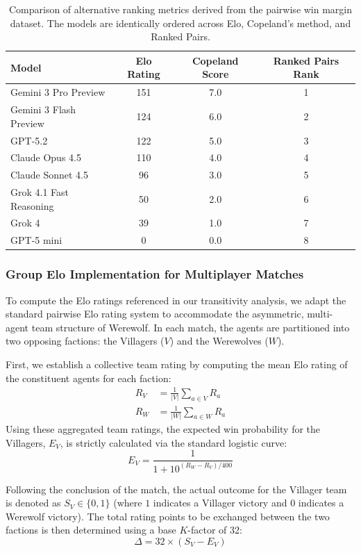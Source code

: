\documentclass{article}
\begin{document}
\begin{table}[H]
    \centering
    \begin{tabular}{l c c c}
        \hline
        \textbf{Model} & \textbf{Elo Rating} & \textbf{Copeland Score} & \textbf{Ranked Pairs Rank} \\
        \hline
        Gemini 3 Pro Preview & 151 & 7.0 & 1 \\
        Gemini 3 Flash Preview & 124 & 6.0 & 2 \\
        GPT-5.2 & 122 & 5.0 & 3 \\
        Claude Opus 4.5 & 110 & 4.0 & 4 \\
        Claude Sonnet 4.5 & 96 & 3.0 & 5 \\
        Grok 4.1 Fast Reasoning & 50 & 2.0 & 6 \\
        Grok 4 & 39 & 1.0 & 7 \\
        GPT-5 mini & 0 & 0.0 & 8 \\
        \hline
    \end{tabular}
    \vspace{2mm}
    \caption{Comparison of alternative ranking metrics derived from the pairwise win margin dataset. The models are identically ordered across Elo, Copeland's method, and Ranked Pairs.}
    \label{tab:alternative_rankings}
\end{table}

\subsubsection{Group Elo Implementation for Multiplayer Matches}
To compute the Elo ratings referenced in our transitivity analysis, we adapt the standard pairwise Elo rating system to accommodate the asymmetric, multi-agent team structure of Werewolf. In each match, the agents are partitioned into two opposing factions: the Villagers ($V$) and the Werewolves ($W$). 

First, we establish a collective team rating by computing the mean Elo rating of the constituent agents for each faction:
\begin{align*}
R_V &= \frac{1}{|V|} \sum_{a \in V} R_a \\
R_W &= \frac{1}{|W|} \sum_{a \in W} R_a
\end{align*}
Using these aggregated team ratings, the expected win probability for the Villagers, $E_V$, is strictly calculated via the standard logistic curve:
$$E_V = \frac{1}{1 + 10^{(R_W - R_V)/400}}$$

Following the conclusion of the match, the actual outcome for the Villager team is denoted as $S_V \in \{0, 1\}$ (where $1$ indicates a Villager victory and $0$ indicates a Werewolf victory). The total rating points to be exchanged between the two factions is then determined using a base $K$-factor of 32:
$$\Delta = 32 \times (S_V - E_V)$$
\end{document}
